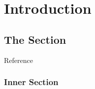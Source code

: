 \chapter{Introduction}
\blindtext


\section{The Section}
\Blindtext Reference~\cite{Leo1994ur}

\subsection{Inner Section}
\Blindtext